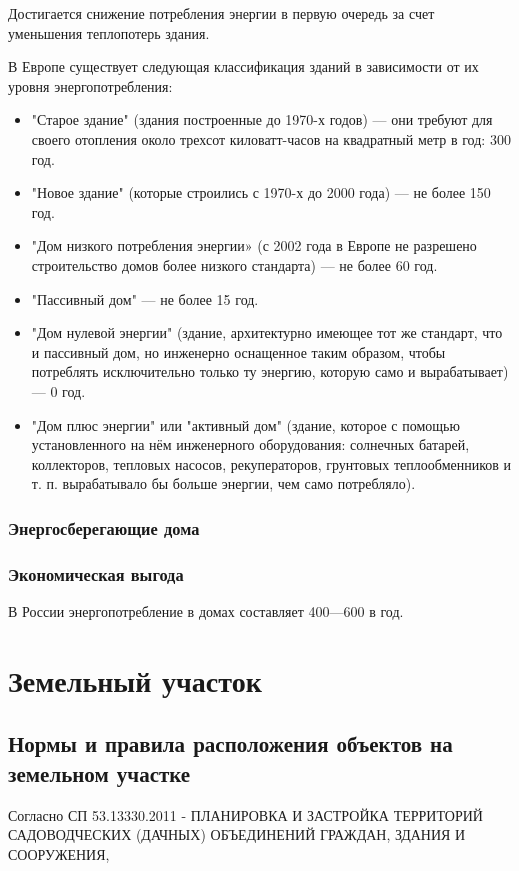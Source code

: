 \documentclass[12pt, twocolumn]{report}
\begin{document}
Достигается снижение потребления энергии в первую очередь за счет уменьшения теплопотерь здания.

В Европе существует следующая классификация зданий в зависимости от их уровня энергопотребления:
\begin{itemize}
	\item "Старое здание" (здания построенные до 1970-х годов) — они требуют для своего отопления около трехсот киловатт-часов на квадратный метр в год: 300 \kwpm год.
	\item "Новое здание" (которые строились с 1970-х до 2000 года) — не более 150 \kwpm год.
	\item "Дом низкого потребления энергии» (с 2002 года в Европе не разрешено строительство домов более низкого стандарта) — не более 60 \kwpm год.
	\item "Пассивный дом" — не более 15 \kwpm год.
	\item "Дом нулевой энергии" (здание, архитектурно имеющее тот же стандарт, что и пассивный дом, но инженерно оснащенное таким образом, чтобы потреблять исключительно только ту энергию, которую само и вырабатывает) — 0 \kwpm год.
	\item "Дом плюс энергии" или "активный дом" (здание, которое с помощью установленного на нём инженерного оборудования: солнечных батарей, коллекторов, тепловых насосов, рекуператоров, грунтовых теплообменников и т. п. вырабатывало бы больше энергии, чем само потребляло).
	
\end{itemize}

\section{Энергосберегающие дома}


\section{Экономическая выгода}
В России энергопотребление в домах составляет 400—600 \kwpm в год.

\part{Земельный участок}
\chapter{Нормы и правила расположения объектов на земельном участке}
Согласно СП 53.13330.2011 - ПЛАНИРОВКА И ЗАСТРОЙКА ТЕРРИТОРИЙ САДОВОДЧЕСКИХ (ДАЧНЫХ) ОБЪЕДИНЕНИЙ ГРАЖДАН, ЗДАНИЯ И СООРУЖЕНИЯ, 
\end{document}
